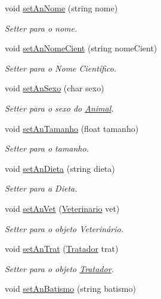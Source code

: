 \begin{DoxyCompactItemize}
void \hyperlink{classAnimal_a4671ad519aa7c27ef72bcf21d00f2afb}{set\+An\+Nome} (string nome)
\begin{DoxyCompactList}\small\item\em Setter para o nome. \end{DoxyCompactList}\item 
void \hyperlink{classAnimal_a1657423dc5747a03587961b1e8198df9}{set\+An\+Nome\+Cient} (string nome\+Cient)
\begin{DoxyCompactList}\small\item\em Setter para o Nome Científico. \end{DoxyCompactList}\item 
void \hyperlink{classAnimal_ad9aceda995534ac42ff744e1f4755e64}{set\+An\+Sexo} (char sexo)
\begin{DoxyCompactList}\small\item\em Setter para o sexo do \hyperlink{classAnimal}{Animal}. \end{DoxyCompactList}\item 
void \hyperlink{classAnimal_a97269d392f68c95a04c77c0f226d9a4a}{set\+An\+Tamanho} (float tamanho)
\begin{DoxyCompactList}\small\item\em Setter para o tamanho. \end{DoxyCompactList}\item 
void \hyperlink{classAnimal_a24cbb6a7b596c3dfcd41b842926865ba}{set\+An\+Dieta} (string dieta)
\begin{DoxyCompactList}\small\item\em Setter para a Dieta. \end{DoxyCompactList}\item 
void \hyperlink{classAnimal_afa0c79f46bbce259561b23c2329140ed}{set\+An\+Vet} (\hyperlink{classVeterinario}{Veterinario} vet)
\begin{DoxyCompactList}\small\item\em Setter para o objeto Veterinário. \end{DoxyCompactList}\item 
void \hyperlink{classAnimal_a0b45ad707287f6fdcaee769352481e00}{set\+An\+Trat} (\hyperlink{classTratador}{Tratador} trat)
\begin{DoxyCompactList}\small\item\em Setter para o objeto \hyperlink{classTratador}{Tratador}. \end{DoxyCompactList}\item 
void \hyperlink{classAnimal_a2e8b46c87f3e287979bfa71333c9993c}{set\+An\+Batismo} (string batismo)

\end{DoxyCompactItemize}
